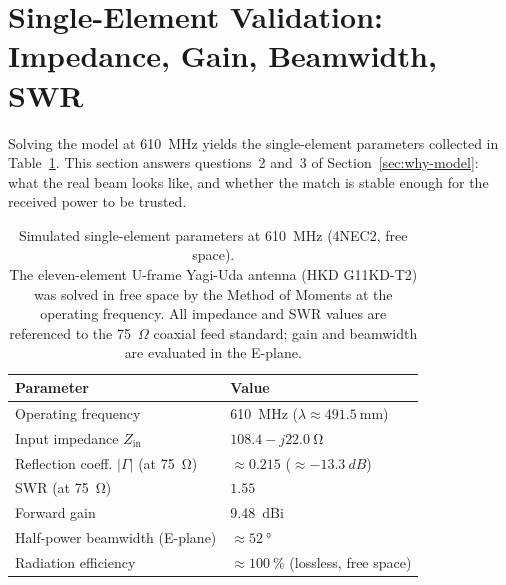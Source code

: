 \section{Single-Element Validation: Impedance, Gain, Beamwidth, SWR}
\label{sec:single-element-validation}

Solving the model at \SI{610}{\mega\hertz} yields the single-element parameters
collected in Table~\ref{tab:ant-params-sim}. This section answers questions~2
and~3 of Section~\ref{sec:why-model}: what the real beam looks like, and
whether the match is stable enough for the received power to be trusted.

\begin{table}[H]
  \centering
  \caption[Simulated single-element parameters at 610~MHz (4NEC2, free space)]{Simulated single-element parameters at 610~MHz (4NEC2, free space).\\[4pt]
           The eleven-element U-frame Yagi-Uda antenna (HKD G11KD-T2) was
           solved in free space by the Method of Moments at the operating
           frequency. All impedance and SWR values are referenced to the
           75~$\Omega$ coaxial feed standard; gain and beamwidth are evaluated
           in the E-plane.}
  \label{tab:ant-params-sim}
  \renewcommand{\arraystretch}{1.25}
  \begin{tabularx}{\textwidth}{l >{\raggedright\arraybackslash}X}
    \toprule
    \textbf{Parameter} & \textbf{Value} \\
    \midrule
    Operating frequency               & \SI{610}{\mega\hertz} ($\lambda\approx\SI{491.5}{\milli\metre}$) \\
    Input impedance $Z_\mathrm{in}$   & $108.4 - j22.0~\si{\ohm}$ \\
    Reflection coeff. $|\Gamma|$ (at \SI{75}{\ohm}) & $\approx 0.215$ ($\approx\SI{-13.3}{dB}$) \\
    SWR (at \SI{75}{\ohm})            & $1.55$ \\
    Forward gain                      & \SI{9.48}{dBi} \\
    Half-power beamwidth (E-plane)    & $\approx\SI{52}{\degree}$ \\
    Radiation efficiency              & $\approx\SI{100}{\percent}$ (lossless, free space) \\
    \bottomrule
  \end{tabularx}
\end{table}

